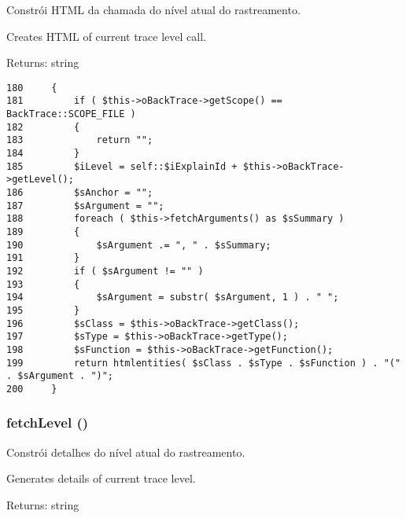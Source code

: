 Constrói HTML da chamada do nível atual do rastreamento.

Creates HTML of current trace level call.

\begin{Desc}
\item[Returns:]string \end{Desc}


\begin{Code}\begin{verbatim}180     {
181         if ( $this->oBackTrace->getScope() == BackTrace::SCOPE_FILE )
182         {
183             return "";
184         }
185         $iLevel = self::$iExplainId + $this->oBackTrace->getLevel();
186         $sAnchor = "";
187         $sArgument = "";
188         foreach ( $this->fetchArguments() as $sSummary )
189         {
190             $sArgument .= ", " . $sSummary;
191         }
192         if ( $sArgument != "" )
193         {
194             $sArgument = substr( $sArgument, 1 ) . " ";
195         }
196         $sClass = $this->oBackTrace->getClass();
197         $sType = $this->oBackTrace->getType();
198         $sFunction = $this->oBackTrace->getFunction();
199         return htmlentities( $sClass . $sType . $sFunction ) . "(" . $sArgument . ")";
200     }
\end{verbatim}
\end{Code}


\hypertarget{class_back_trace_explain_b47849ae8b333456a7406a86fce7cc30}{
\subsubsection[{fetchLevel}]{\setlength{\rightskip}{0pt plus 5cm}fetchLevel ()}}
\label{class_back_trace_explain_b47849ae8b333456a7406a86fce7cc30}


Constrói detalhes do nível atual do rastreamento.

Generates details of current trace level.

\begin{Desc}
\item[Returns:]string \end{Desc}


